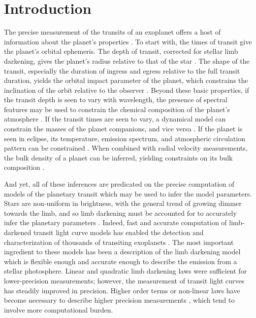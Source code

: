 \documentclass[modern,trackchanges]{aastex63}
\newcommand{\edited}{}
\begin{document}
\section{Introduction}
\label{sec:intro}

The precise measurement of the transits of an exoplanet offers a host of information
about the planet's properties \citep{Charbonneau2007,Winn2008,Winn2010,Haswell2010}.  To start with, 
the times of transit give the planet's orbital ephemeris.  The depth of transit, corrected 
for stellar limb darkening, gives the planet's radius relative to that of the star
{\edited \citep{Heller2019}}.   The
shape of the transit, especially the duration of ingress and egress relative to
the full transit duration, yields the orbital impact parameter of the planet, which
constrains the inclination of the orbit relative to the observer \citep{Seager2003}.
Beyond these basic properties, if the transit depth is seen to vary with wavelength,
the presence of spectral features may be used to constrain the chemical composition
of the planet's atmosphere \citep{Brown2001,Seager2010,Burrows2014,Crossfield2015,
Madhusudhan2019}.  If the transit times are seen to vary, a dynamical
model can constrain the masses of the planet companions, and vice versa \citep{Agol2005,Holman2005}.  If
the planet is seen in eclipse, its temperature, emission spectrum, and atmospheric
circulation pattern can be constrained \citep{Cowan2017,Alonso2018}.  When combined with radial velocity
measurements, the bulk density of a planet can be inferred, yielding constraints
on its bulk composition \citep{Udry2007}.

And yet, all of these inferences are predicated on the precise computation of models
of the planetary transit which may be used to infer the model parameters.  Stars
are non-uniform in brightness, with the general
trend of growing dimmer towards the limb, and so limb darkening must be accounted
for to accurately infer the planetary parameters \citep{Csizmadia2018}.  Indeed, fast
and accurate computation of limb-darkened transit light curve models has enabled the
detection and characterization of thousands of transiting exoplanets \citep{MandelAgol2002}.
The most important ingredient to these models has been a description of the
limb darkening model which is flexible enough and accurate enough to describe the
emission from a stellar photosphere.  Linear and quadratic limb darkening laws
were sufficient for lower-precision measurements; however, the measurement of
transit light curves has steadily improved in precision.  Higher order terms or non-linear laws
have become necessary to describe higher precision measurements \citep{Kopal1950,Claret2000,
Gimenez2006}, which tend to involve more computational burden.
\end{document}
